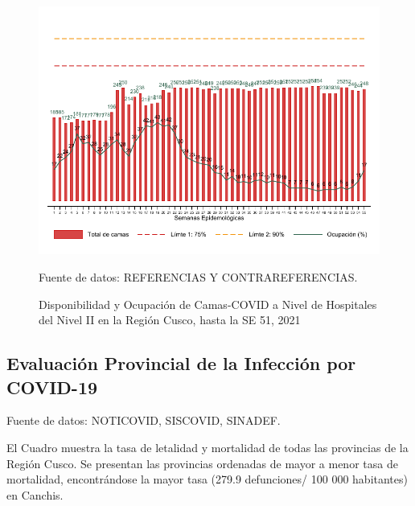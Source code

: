 \documentclass[12pt,a4paper,openany]{book}
\begin{document}
\begin{figure}[h]
	\caption{Disponibilidad y Ocupación de Camas-COVID a Nivel de Hospitales del Nivel II en la Región Cusco, hasta la SE 51, 2021}\label{fig:ocupacion_2nivel}
	\begin{center}
		\includegraphics[width=0.95\linewidth]{../figuras/nivel_2.pdf}
	\end{center}
	{\footnotesize {Fuente de datos: REFERENCIAS Y CONTRAREFERENCIAS.}}
\end{figure}
\clearpage
\begin{landscape}
	
	\subsection*{Evaluación Provincial de la Infección por COVID-19} 
	
	
	{\footnotesize Fuente de datos: NOTICOVID, SISCOVID, SINADEF.}
	
	\noindent El Cuadro muestra la tasa de letalidad y mortalidad de todas las provincias de la Región Cusco. Se presentan las provincias ordenadas de mayor a menor tasa de mortalidad, encontrándose la mayor tasa (279.9 defunciones/ 100 000 habitantes) en Canchis. 
	
\end{landscape}


\clearpage
\end{document}
